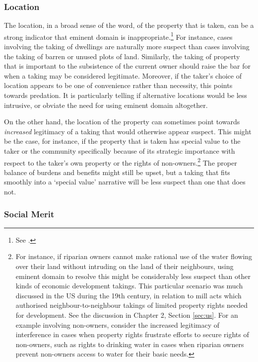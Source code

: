 \subsubsection*{Location}

The location, in a broad sense of the word, of the property that is taken, can be a strong indicator that eminent domain is inappropriate.\footnote{See \cite[33-34]{gray11}.} For instance, cases involving the taking of dwellings are naturally more suspect than cases involving the taking of barren or unused plots of land. Similarly, the taking of property that is important to the subsistence of the current owner should raise the bar for when a taking may be considered legitimate. Moreover, if the taker's choice of location appears to be one of convenience rather than necessity, this points towards predation. It is particularly telling if alternative locations would be less intrusive, or obviate the need for using eminent domain altogether.


On the other hand, the location of the property can sometimes point towards {\it increased} legitimacy of a taking that would otherwise appear suspect. This might be the case, for instance, if the property that is taken has special value to the taker or the community specifically because of its strategic importance with respect to the taker's own property or the rights of non-owners.\footnote{For instance, if riparian owners cannot make rational use of the water flowing over their land without intruding on the land of their neighbours, using eminent domain to resolve this might be considerably less suspect than other kinds of economic development takings. This particular scenario was much discussed in the US during the 19th century, in relation to mill acts which authorised neighbour-to-neighbour takings of limited property rights needed for development. See the discussion in Chapter 2, Section \ref{sec:us}. For an example involving non-owners, consider the increased legitimacy of interference in cases when property rights frustrate efforts to secure rights of non-owners, such as rights to drinking water in cases when riparian owners prevent non-owners access to water for their basic needs.} The proper balance of burdens and benefits might still be upset, but a taking that fits smoothly into a `special value' narrative will be less suspect than one that does not.

\subsubsection*{Social Merit}

